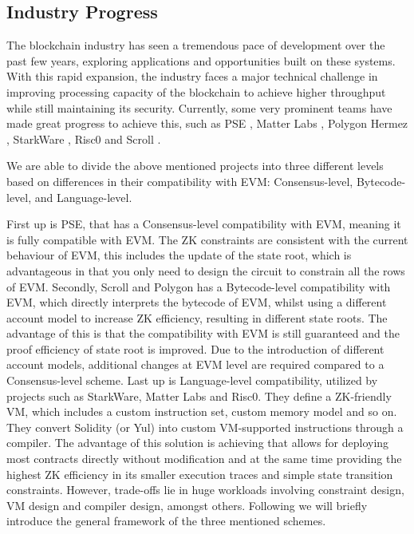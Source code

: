 \subsection{Industry Progress}

The blockchain industry has seen a tremendous pace of development over the past few years, exploring applications and opportunities built on these systems. With this rapid expansion, the industry faces a major technical challenge in improving processing capacity of the blockchain to achieve higher throughput while still maintaining its security. Currently, some very prominent teams have made great progress to achieve this, such as PSE \cite{website:pse}, Matter Labs \cite{website:matter-labs}, Polygon Hermez \cite{website:hermez}, StarkWare \cite{website:starkware}, Risc0 \cite{website:risc0} and Scroll \cite{website:scroll}.

We are able to divide the above mentioned projects into three different levels based on differences in their compatibility with EVM: Consensus-level, Bytecode-level, and Language-level.

First up is PSE, that has a Consensus-level compatibility with EVM, meaning it is fully compatible with EVM. The ZK constraints are consistent with the current behaviour of EVM, this includes the update of the state root, which is advantageous in that you only need to design the circuit to constrain all the rows of EVM. Secondly, Scroll and Polygon has a Bytecode-level compatibility with EVM, which directly interprets the bytecode of EVM, whilst using a different account model to increase ZK efficiency, resulting in different state roots. The advantage of this is that the compatibility with EVM is still guaranteed and the proof efficiency of state root is improved. Due to the introduction of different account models, additional changes at EVM level are required compared to a Consensus-level scheme. Last up is Language-level compatibility, utilized by projects such as StarkWare, Matter Labs and Risc0. They define a ZK-friendly VM, which includes a custom instruction set, custom memory model and so on. They convert Solidity (or Yul) into custom VM-supported instructions through a compiler. The advantage of this solution is achieving that allows for deploying most contracts directly without modification and at the same time providing the highest ZK efficiency in its smaller execution traces and simple state transition constraints. However, trade-offs lie in huge workloads involving constraint design, VM design and compiler design, amongst others. Following we will briefly introduce the general framework of the three mentioned schemes.

